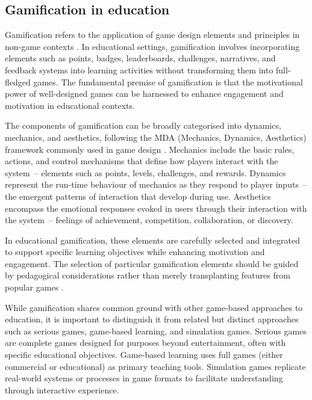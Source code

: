 \documentclass[cte]{acnsart}
\begin{document}
\subsection{Gamification in education}


Gamification refers to the application of game design elements and principles in non-game contexts \cite{Deterding2011}. In educational settings, gamification involves incorporating elements such as points, badges, leaderboards, challenges, narratives, and feedback systems into learning activities without transforming them into full-fledged games. The fundamental premise of gamification is that the motivational power of well-designed games can be harnessed to enhance engagement and motivation in educational contexts.

The components of gamification can be broadly categorised into dynamics, mechanics, and aesthetics, following the MDA (Mechanics, Dynamics, Aesthetics) framework commonly used in game design \cite{Bozic2024538}. Mechanics include the basic rules, actions, and control mechanisms that define how players interact with the system~-- elements such as points, levels, challenges, and rewards. Dynamics represent the run-time behaviour of mechanics as they respond to player inputs~-- the emergent patterns of interaction that develop during use. Aesthetics encompass the emotional responses evoked in users through their interaction with the system~-- feelings of achievement, competition, collaboration, or discovery.

In educational gamification, these elements are carefully selected and integrated to support specific learning objectives while enhancing motivation and engagement. The selection of particular gamification elements should be guided by pedagogical considerations rather than merely transplanting features from popular games \cite{Prieto-Andreu2024244}.


While gamification shares common ground with other game-based approaches to education, it is important to distinguish it from related but distinct approaches such as serious games, game-based learning, and simulation games. Serious games are complete games designed for purposes beyond entertainment, often with specific educational objectives. Game-based learning uses full games (either commercial or educational) as primary teaching tools. Simulation games replicate real-world systems or processes in game formats to facilitate understanding through interactive experience.
\end{document}
